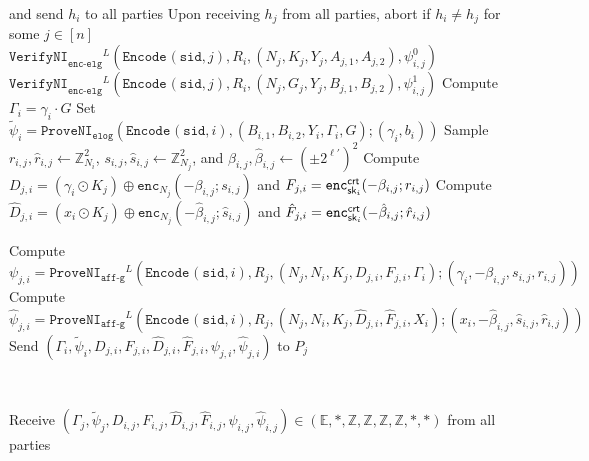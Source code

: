 \documentclass[11pt]{article}
\def\crt{{\sf crt}}
\newcommand{\jnote}[1]{{\textcolor{blue}{Jon's note: #1}}}
\newcommand{\enc}{\ensuremath{\mathtt{enc}}}
\newcommand{\enci}[1]{\ensuremath{\mathtt{enc}_{N_{#1}}}}
\newcommand{\sid}{\ensuremath{\mathtt{sid}}}
\newcommand{\proveni}[1]{\ensuremath{\mathtt{ProveNI}_{\mathtt{#1}}}}
\newcommand{\verifyni}[1]{\ensuremath{\mathtt{VerifyNI}_{\mathtt{#1}}}}
\newcommand{\Encode}[1][]{\ensuremath{\mathtt{Encode}_{\mathtt{#1}}}}
\newcommand{\sk}{\textsf{sk}}
\newcommand{\E}{\mathbb{E}}
\newcommand{\Z}{\mathbb{Z}}
\newcommand{\?}[1]{\stackrel{?}{#1}}
\begin{document}
\begin{description}
\begin{algorithmic}[1]
                   and send $h_i$ to all parties
            \State Upon receiving $h_j$ from all parties, abort if 
                   $h_i \neq h_j$ for some $j \in [n]$
        \EndIf
            \State $\verifyni{enc\mbox{-}elg}^L(\Encode(\sid, j), R_i, (N_j, K_j, Y_j, A_{j,1}, A_{j,2}), \psi^0_{i,j})$
            \State $\verifyni{enc\mbox{-}elg}^L(\Encode(\sid, j), R_i, (N_j, G_j, Y_j, B_{j,1}, B_{j,2}), \psi^1_{i,j})$
        \EndFor
        \State Compute $\Gamma_i = \gamma_i \cdot G$
        \State Set $\tilde \psi_i = \proveni{elog}(\Encode(\sid, i), (B_{i,1}, B_{i,2}, Y_i, \Gamma_i, G); (\gamma_i, b_i))$
            \State Sample $r_{i,j}, \hat{r}_{i,j} \gets \Z_{N_i}^2$,
                          $s_{i,j}, \hat{s}_{i,j} \gets \Z_{N_j}^2$, and
                          $\beta_{i,j}, \hat{\beta}_{i,j} \gets (\pm 2^{\ell'})^2$
            \State Compute $D_{j,i} = (\gamma_i \odot K_j) \oplus \enci{j}(-\beta_{i,j}; s_{i,j})$
                   and $F_{j,i} = \enc^\crt_{\sk_i}(-\beta_{i,j}; r_{i,j})$
            \State Compute $\hat{D}_{j,i} = (x_i \odot K_j) \oplus \enci{j}(-\hat{\beta}_{i,j}; \hat{s}_{i,j})$
                   and $\hat{F}_{j,i} = \enc^\crt_{\sk_i}(-\hat{\beta}_{i,j}; \hat{r}_{i,j})$

            \State Compute $\psi_{j,i} = \proveni{aff\mbox{-}g}^L(\Encode(\sid, i), R_j, (N_j, N_i, K_j, D_{j,i}, F_{j,i}, \Gamma_i); (\gamma_i, -\beta_{i,j}, s_{i,j}, r_{i,j}))$
            \State Compute $\hat{\psi}_{j,i} = \proveni{aff\mbox{-}g}^L(\Encode(\sid, i), R_j, (N_j, N_i, K_j, \hat{D}_{j,i}, \hat{F}_{j,i}, X_i); (x_i, -\hat{\beta}_{i,j}, \hat{s}_{i,j}, \hat{r}_{i,j}))$
            \State Send $(\Gamma_i, \tilde \psi_i, D_{j,i}, F_{j,i}, \hat{D}_{j,i}, \hat{F}_{j,i}, \psi_{j,i}, \hat{\psi}_{j,i})$ to $P_j$
        \EndFor
    \end{algorithmic}

    \item[\textbf{Round 3.}] \ 
    \begin{algorithmic}[1]
        \State Receive $(\Gamma_j, \tilde \psi_j, D_{i,j}, F_{i,j}, \hat{D}_{i,j}, \hat{F}_{i,j}, \psi_{i,j}, \hat{\psi}_{i,j})
            \in (\E, *, \Z, \Z, \Z, \Z, *, *)$ from all parties



\end{algorithmic}
\end{description}
\end{document}
